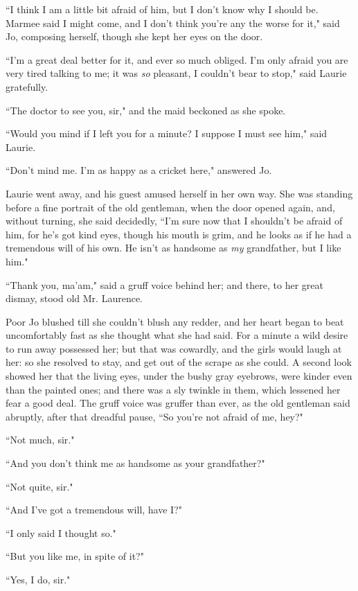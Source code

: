 ``I think I am a little bit afraid of him, but I don't
know why I should be. Marmee said I might come, and I
don't think you're any the worse for
it," said Jo, composing herself, though she kept her eyes on the door.

``I'm a great deal better for it, and ever so much
obliged. I'm only afraid you are very tired talking to
me; it was \emph{so} pleasant, I couldn't bear to stop,"
said Laurie gratefully.

``The doctor to see you, sir," and the maid beckoned as she spoke.

``Would you mind if I left you for a minute? I suppose I must see him,"
said Laurie.

``Don't mind me. I'm as happy as a
cricket here," answered Jo.

Laurie went away, and his guest amused herself in her own way. She was
standing before a fine portrait of the old gentleman, when the door
opened again, and, without turning, she said decidedly,
``I'm sure now that I shouldn't be afraid
of him, for he's got kind eyes, though his mouth is
grim, and he looks as if he had a tremendous will of his own. He
isn't as handsome as \emph{my} grandfather, but I like
him."

``Thank you, ma'am," said a gruff voice behind her; and
there, to her great dismay, stood old Mr. Laurence.

Poor Jo blushed till she couldn't blush any redder, and
her heart began to beat uncomfortably fast as she thought what she had
said. For a minute a wild desire to run away possessed her; but that was
cowardly, and the girls would laugh at her: so she resolved to stay, and
get out of the scrape as she could. A second look showed her that the
living eyes, under the bushy gray eyebrows, were kinder even than the
painted ones; and there was a sly twinkle in them, which lessened her
fear a good deal. The gruff voice was gruffer than ever, as the old
gentleman said abruptly, after that dreadful pause, ``So
you're not afraid of me, hey?"

``Not much, sir."

``And you don't think me as handsome as your
grandfather?"

``Not quite, sir."

``And I've got a tremendous will, have I?"

``I only said I thought so."

``But you like me, in spite of it?"

``Yes, I do, sir."

